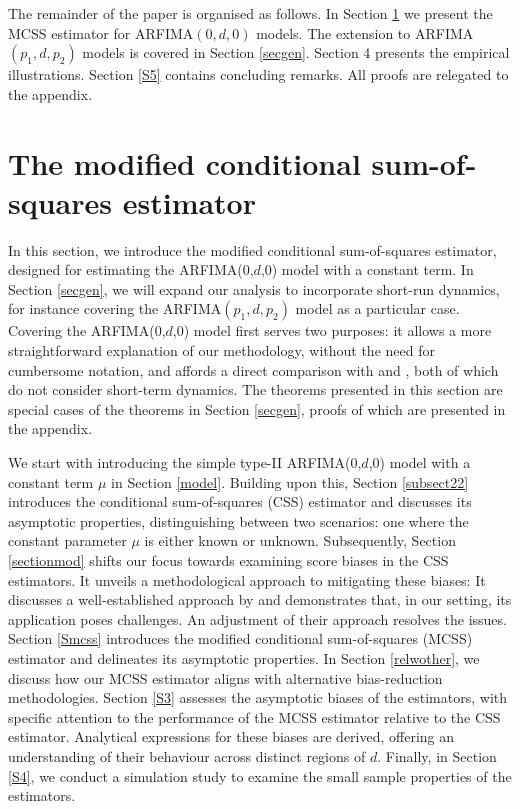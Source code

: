 {{The remainder of the paper is organised as follows. In Section \ref{S2} we present the MCSS estimator for ARFIMA$(0,d,0)$ models. The extension to ARFIMA$(p_1,d,p_2)$ models is covered in Section \ref{secgen}.  Section 4 presents
the empirical illustrations. Section \ref{S5} contains  concluding remarks. All proofs  are relegated to the appendix.



\section{The modified conditional sum-of-squares estimator}\label{S2}

In this section, we introduce the modified conditional sum-of-squares estimator, designed for estimating the ARFIMA(0,$d$,0) model with a constant term. In Section \ref{secgen}, we will expand our analysis to incorporate short-run dynamics, for instance covering the ARFIMA$(p_1,d,p_2)$ model as a particular case. Covering the ARFIMA(0,$d$,0) model first serves two purposes: it allows a more straightforward explanation of our methodology, without the need for cumbersome notation, and affords a direct comparison with \textcite{lieberman2005expansions} and \textcite{johansen2016role}, both of which do not consider short-term dynamics. The theorems presented in this section are special cases of the theorems in Section \ref{secgen}, proofs of which are presented in the appendix.

We start with introducing the simple type-II ARFIMA(0,$d$,0) model with a constant term $\mu$ in Section \ref{model}.  Building upon this, Section \ref{subsect22} introduces the conditional sum-of-squares (CSS) estimator and
discusses its asymptotic properties, distinguishing between two scenarios: one where the constant parameter $\mu$ is either known or unknown. Subsequently, Section \ref{sectionmod} shifts our focus towards examining score biases
in the CSS estimators. It unveils a methodological approach to mitigating these biases: It discusses a well-established approach by \textcite{mccullagh1990simple} and demonstrates that, in our setting, its application poses
challenges. An adjustment of their approach resolves the issues. Section \ref{Smcss} introduces the modified conditional sum-of-squares (MCSS) estimator and delineates its asymptotic properties. In Section \ref{relwother}, we
discuss how our MCSS estimator aligns with alternative bias-reduction methodologies. Section \ref{S3} assesses the asymptotic biases of the estimators, with specific attention to the performance of the MCSS
estimator relative to the CSS estimator. Analytical expressions for these biases are derived, offering an understanding of their behaviour across distinct regions of $d$. Finally, in Section \ref{S4}, we conduct a
simulation study to examine the small sample properties of the estimators.



}}

